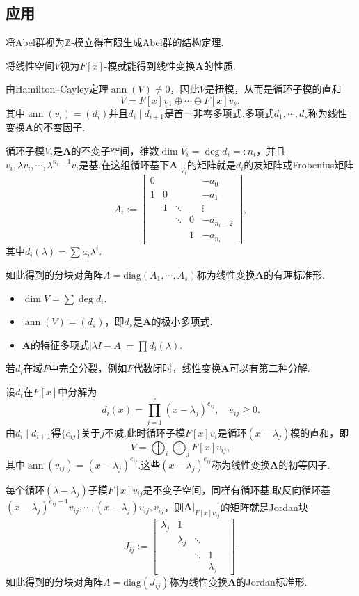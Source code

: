 \subsection{应用}
将Abel群视为$\mathbb{Z}$-模立得\hyperlink{thm:StrucOfFiniteGeneratedAbelGrp}{有限生成Abel群的结构定理}.

将线性空间$V$视为$F[x]$-模就能得到线性变换$\bm A$的性质.

由Hamilton--Cayley定理$\operatorname*{ann}(V)\ne 0$，因此$V$是扭模，从而是循环子模的直和
\[
    V=F[x]v_1\oplus\cdots\oplus F[x]v_s,
\]
其中$\operatorname*{ann}(v_i)=(d_i)$并且$d_i\mid d_{i+1}$是首一非零多项式.多项式$d_1,\cdots,d_s$称为线性变换$\bm A$的{\heiti 不变因子}.

循环子模$V_i$是$\bm A$的不变子空间，维数$\dim V_i=\deg d_i=:n_i$，并且$v_i,\lambda v_i,\cdots,\lambda^{n_i-1}v_i$是基.在这组循环基下$\bm A|_{V_i}$的矩阵就是$d_i$的{\heiti 友矩阵}或{\heiti Frobenius矩阵}
\[
    A_i:=\begin{bmatrix}
        0&&&&-a_0\\
        1&0&&&-a_1\\
        &1&\ddots&&\vdots\\
        &&\ddots&0&-a_{n_i-2}\\
        &&&1&-a_{n_i}
    \end{bmatrix},
\]
其中$d_i(\lambda)=\sum a_i\lambda^i$.

如此得到的分块对角阵$A=\mathrm{diag}(A_1,\cdots,A_s)$称为线性变换$\bm A$的{\heiti 有理标准形}.
\begin{itemize}
    \item $\dim V=\sum\deg d_i$.
    \item $\operatorname*{ann}(V)=(d_s)$，即$d_s$是$\bm A$的极小多项式.
    \item $\bm A$的特征多项式$|\lambda I-A|=\prod d_i(\lambda)$.
\end{itemize}

若$d_i$在域$F$中完全分裂，例如$F$代数闭时，线性变换$\bm A$可以有第二种分解.

设$d_i$在$F[x]$中分解为
\[
    d_i(x)=\prod_{j=1}^r(x-\lambda_j)^{e_{ij}},\quad e_{ij}\ge 0.
\]
由$d_i\mid d_{i+1}$得$\{e_{ij}\}$关于$j$不减.此时循环子模$F[x]v_i$是循环$(x-\lambda_j)$模的直和，即
\[
    V=\bigoplus_i\bigoplus_j F[x]v_{ij},
\]
其中$\operatorname*{ann}(v_{ij})=(x-\lambda_j)^{e_{ij}}$.这些$(x-\lambda_j)^{e_{ij}}$称为线性变换$\bm A$的{\heiti 初等因子}.

每个循环$(\lambda-\lambda_j)$子模$F[x]v_{ij}$是不变子空间，同样有循环基.取反向循环基$(x-\lambda_j)^{e_{ij}-1}v_{ij},\cdots,(x-\lambda_j)v_{ij},v_{ij}$，则$\bm A|_{F[x]v_{ij}}$的矩阵就是{\heiti Jordan块}
\[
    J_{ij}:=\begin{bmatrix}
        \lambda_j&1&&&\\
        &\lambda_j&\ddots&\\
        &&\ddots&1\\
        &&&\lambda_j
    \end{bmatrix}.
\]
如此得到的分块对角阵$A=\mathrm{diag}(J_{ij})$称为线性变换$\bm A$的{\heiti Jordan标准形}.

